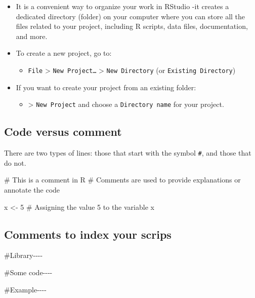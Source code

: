 \documentclass[
  letterpaper,
  DIV=11,
  numbers=noendperiod,
  oneside]{scrartcl}
\newenvironment{Shaded}{\begin{snugshade}}{\end{snugshade}}
\newcommand{\CommentTok}[1]{\textcolor[rgb]{0.37,0.37,0.37}{#1}}
\newcommand{\DecValTok}[1]{\textcolor[rgb]{0.68,0.00,0.00}{#1}}
\newcommand{\NormalTok}[1]{\textcolor[rgb]{0.00,0.23,0.31}{#1}}
\newcommand{\OtherTok}[1]{\textcolor[rgb]{0.00,0.23,0.31}{#1}}
\providecommand{\tightlist}{%
  \setlength{\itemsep}{0pt}\setlength{\parskip}{0pt}}\usepackage{longtable,booktabs,array}
\begin{document}
\begin{itemize}
\item
  It is a convenient way to organize your work in RStudio -it creates a
  dedicated directory (folder) on your computer where you can store all
  the files related to your project, including R scripts, data files,
  documentation, and more.
\item
  To create a new project, go to:

  \begin{itemize}
  \tightlist
  \item
    \texttt{File} \textgreater{} \texttt{New\ Project…} \textgreater{}
    \texttt{New\ Directory} (or \texttt{Existing\ Directory})
  \end{itemize}
\item
  If you want to create your project from an existing folder:

  \begin{itemize}
  \tightlist
  \item
    \textgreater{} \texttt{New\ Project} and choose a
    \texttt{Directory\ name} for your project.
  \end{itemize}
\end{itemize}

\subsection{Code versus comment}\label{code-versus-comment}

There are two types of lines: those that start with the symbol
\texttt{\#}, and those that do not.

\begin{Shaded}
\begin{Highlighting}[numbers=left,,]
\CommentTok{\# This is a comment in R}
\CommentTok{\# Comments are used to provide explanations or annotate the code}

\NormalTok{x }\OtherTok{\textless{}{-}} \DecValTok{5}  \CommentTok{\# Assigning the value 5 to the variable x}
\end{Highlighting}
\end{Shaded}

\subsection{Comments to index your
scrips}\label{comments-to-index-your-scrips}

\begin{Shaded}
\begin{Highlighting}[]
\CommentTok{\#Library{-}{-}{-}{-}}

\CommentTok{\#Some code{-}{-}{-}{-} }

\CommentTok{\#Example{-}{-}{-}{-}}
\end{Highlighting}
\end{Shaded}
\end{document}
